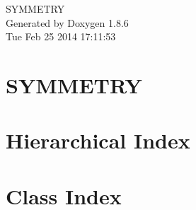 \documentclass[twoside]{book}
\newcommand{\clearemptydoublepage}{%
  \newpage{\pagestyle{empty}\cleardoublepage}%
}
\begin{document}
\hypersetup{pageanchor=false}
\begin{titlepage}
\vspace*{7cm}
\begin{center}%
{\Large S\-Y\-M\-M\-E\-T\-R\-Y }\\
\vspace*{1cm}
{\large Generated by Doxygen 1.8.6}\\
\vspace*{0.5cm}
{\small Tue Feb 25 2014 17:11:53}\\
\end{center}
\end{titlepage}
\clearemptydoublepage
\tableofcontents
\clearemptydoublepage
{}
\hypersetup{pageanchor=true}

\chapter{S\-Y\-M\-M\-E\-T\-R\-Y}
\label{index}\hypertarget{index}{}
\chapter{Hierarchical Index}

\chapter{Class Index}

\end{document}
